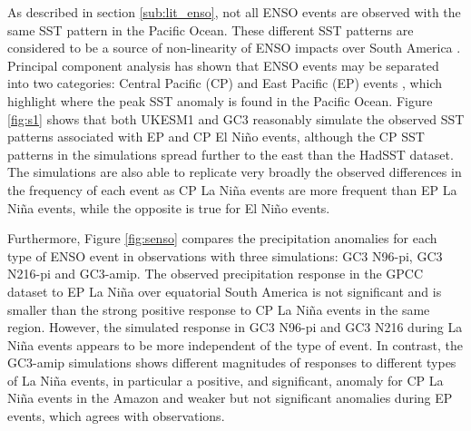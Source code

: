   
As described in section \ref{sub:lit_enso}, not all ENSO events are observed with the same SST  pattern in the Pacific Ocean. These different SST patterns are considered to be a source of non-linearity of ENSO impacts over South America \citep{sulca2018,cai2020}.
Principal component analysis has shown that ENSO events may be separated into two categories: Central Pacific (CP) and East Pacific (EP) events \citep{cai2020}, which highlight where the peak SST anomaly is found in the Pacific Ocean.
Figure \ref{fig:s1} shows that both UKESM1 and GC3 reasonably simulate the observed SST patterns associated with EP and CP El Niño events, although the CP SST patterns in the simulations spread further to the east than the HadSST dataset.
The simulations are also able to replicate very broadly the observed differences in the frequency of each event as CP La Niña events are more frequent than EP La Niña events, while the opposite is true for El Niño events.

Furthermore, Figure \ref{fig:senso} compares the precipitation anomalies for each type of ENSO event in observations with three simulations: GC3 N96-pi, GC3 N216-pi and GC3-amip. 
The observed precipitation response in the GPCC dataset to EP La Niña over equatorial South America is not significant and is smaller than the strong positive response to CP La Niña events in the same region. However,  the simulated response in GC3 N96-pi and GC3 N216 during La Niña events appears to be more independent of the type of event. In contrast, the GC3-amip simulations shows different magnitudes of responses to different types of La Niña events, in particular a positive, and significant, anomaly for CP La Niña events in the Amazon and weaker but not significant anomalies during EP events, which agrees with observations.

